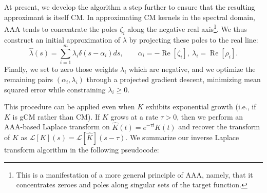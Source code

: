 \documentclass{cams-l} %
\newcommand{\cL}{\mathcal L}
\newcommand{\op}{\operatorname}
\renewcommand{\Re}{\op{Re}}
\theoremstyle{definition}
\theoremstyle{remark}
\numberwithin{equation}{section}
\begin{document}
At present, we develop the algorithm a step further to ensure that the resulting approximant is itself CM. In approximating CM kernels in the spectral domain, AAA tends to concentrate the poles $\zeta_i$ along the negative real axis\footnote{This is a manifestation of a more general principle of AAA, namely, that it concentrates zeroes and poles along singular sets of the target function.}. We thus construct an initial approximation of $\lambda$ by projecting these poles to the real line:
\begin{equation}
    \widehat{\lambda}(s) = \sum_{i=1}^m \lambda_i\delta(s - \alpha_i)ds, \qquad \alpha_i = -\Re[\zeta_i], \ \lambda_i = \Re[\rho_i].
\end{equation}
Finally, we set to zero those weights $\lambda_i$ which are negative, and we optimize the remaining pairs $(\alpha_i, \lambda_i)$ through a projected gradient descent, minimizing mean squared error while constraining $\lambda_i\geq 0$. 

This procedure can be applied even when $K$ exhibits exponential growth (i.e., if $K$ is gCM rather than CM). If $K$ grows at a rate $\tau>0$, then we perform an AAA-based Laplace transform on $\widehat{K}(t) = e^{-\tau t}K(t)$ and recover the transform of $K$ as $\cL[K](s) = \cL[\widehat{K}](s-\tau)$. We summarize our inverse Laplace transform algorithm in the following pseudocode:

\bigskip
\end{document}
